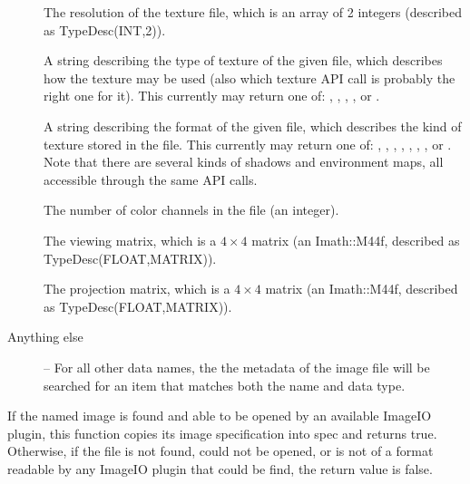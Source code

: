 \begin{description}
\item[\spc] \spc
\vspace{-12pt} \item[\rm {}] The resolution of the texture file, which
is an array of 2 integers (described as {\cf TypeDesc(INT,2)}).

\item[\rm {}] A string describing the type of texture
of the given file, which describes how the texture may be used (also
which texture API call is probably the right one for it).
This currently may return one of: , ,
, , 
or .

\item[\rm {}] A string describing the format of the
given file, which describes the kind of texture stored in the file.
This currently may return one of: , ,
, , , , , or .
Note that there are several kinds of shadows and environment maps,
all accessible through the same API calls.

\item[\rm {}] The number of color channels in the file 
(an integer).

\item[\rm {}] The viewing matrix, which is a
$4 \times 4$ matrix (an {\cf Imath::M44f}, described as {\cf
  TypeDesc(FLOAT,MATRIX)}).

\item[\rm {}] The projection matrix, which is a
$4 \times 4$ matrix (an {\cf Imath::M44f}, described as {\cf
  TypeDesc(FLOAT,MATRIX)}).

\item[Anything else] -- For all other data names, the
the metadata of the image file will be searched for an item that
matches both the name and data type.

\end{description}
\apiend


If the named image is found and able to be opened by an available
ImageIO plugin, this function copies its image specification into
{\cf spec} and returns {\cf true}.  Otherwise, if the file is not
found, could not be opened, or is not of a format readable by any
ImageIO plugin that could be find, the return value is {\cf false}.
\apiend



